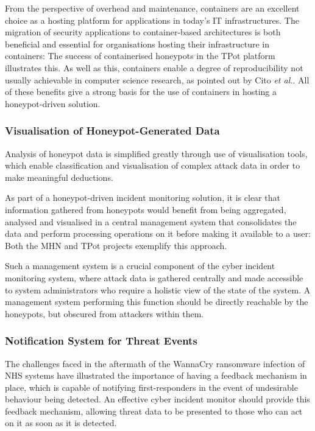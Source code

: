 From the perspective of overhead and maintenance, containers are an excellent choice as a hosting platform for applications in today's IT infrastructures. The migration of security applications to container-based architectures is both beneficial and essential for organisations hosting their infrastructure in containers: The success of containerised honeypots in the TPot platform illustrates this. \cite{TPotWebpagev17} As well as this, containers enable a degree of reproducibility not usually achievable in computer science research, as pointed out by Cito \textit{et al.}. \cite{ReproducableResearchEnvironmentsContainers} All of these benefits give a strong basis for the use of containers in hosting a honeypot-driven solution. 



\subsubsection{Visualisation of Honeypot-Generated Data}
Analysis of honeypot data is simplified greatly through use of visualisation tools, which enable classification and visualisation of complex attack data in order to make meaningful deductions. 

As part of a honeypot-driven incident monitoring solution, it is clear that information gathered from honeypots would benefit from being aggregated, analysed and visualised in a central management system that consolidates the data and perform processing operations on it before making it available to a user: Both the MHN and TPot projects exemplify this approach. \cite{TPotWebpagev17} \cite{ModernHoneyNetworkLaunchAnnouncement}

Such a management system is a crucial component of the cyber incident monitoring system, where attack data is gathered centrally and made accessible to system administrators who require a holistic view of the state of the system. A management system performing this function should be directly reachable by the honeypots, but obscured from attackers within them.  


\subsubsection{Notification System for Threat Events}
The challenges faced in the aftermath of the WannaCry ransomware infection of NHS systems have illustrated the importance of having a feedback mechanism in place, which is capable of notifying first-responders in the event of undesirable behaviour being detected. An effective cyber incident monitor should provide this feedback mechanism, allowing threat data to be presented to those who can act on it as soon as it is detected.


